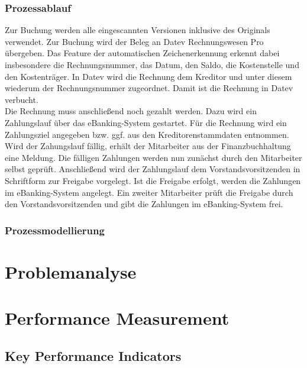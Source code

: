 \subsubsection{Prozessablauf}
Zur Buchung werden alle eingescannten Versionen inklusive des Originals verwendet.
Zur Buchung wird der Beleg an Datev Rechnungswesen Pro übergeben.
Das Feature der automatischen Zeichenerkennung erkennt dabei insbesondere die Rechnungsnummer, das Datum, den Saldo, die Kostenstelle und den Kostenträger.
In Datev wird die Rechnung dem Kreditor und unter diesem wiederum der Rechnungsnummer zugeordnet.
Damit ist die Rechnung in Datev verbucht.\\
Die Rechnung muss anschließend noch gezahlt werden.
Dazu wird ein Zahlungslauf über das eBanking-System gestartet.
Für die Rechnung wird ein Zahlungsziel angegeben bzw. ggf. aus den Kreditorenstammdaten entnommen.
Wird der Zahungslauf fällig, erhält der Mitarbeiter aus der Finanzbuchhaltung eine Meldung.
Die fälligen Zahlungen werden nun zunächst durch den Mitarbeiter selbst geprüft.
Anschließend wird der Zahlungslauf dem Vorstandsvorsitzenden in Schriftform zur Freigabe vorgelegt.
Ist die Freigabe erfolgt, werden die Zahlungen im eBanking-System angelegt.
Ein zweiter Mitarbeiter prüft die Freigabe durch den Vorstandsvorsitzenden und gibt die Zahlungen im eBanking-System frei.

\subsubsection{Prozessmodellierung}





\section{Problemanalyse}

\section{Performance Measurement}
\subsection{Key Performance Indicators}